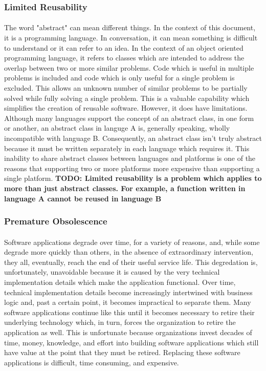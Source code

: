 \documentclass[hidelinks]{article}
\begin{document}
\subsubsection{Limited Reusability}\paragraph{}The word "abstract" can mean different things. In the context of this document, it is a programming language. In conversation, it can mean something is difficult to understand or it can refer to an idea. In the context of an object oriented programming language, it refers to classes which are intended to address the overlap between two or more similar problems. Code which is useful in multiple problems is included and code which is only useful for a single problem is excluded. This allows an unknown number of similar problems to be partially solved while fully solving a single problem. This is a valuable capability which simplifies the creation of reusable software. However, it does have limitations. Although many languages support the concept of an abstract class, in one form or another, an abstract class in languge A is, generally speaking, wholly incompatible with language B. Consequently, an abstract class isn't truly abstract because it must be written separately in each language which requires it. This inability to share abstract classes between languages and platforms is one of the reasons that supporting two or more platforms more expensive than supporting a single platform.
\textbf{TODO: Limited reusability is a problem which applies to more than just abstract classes. For example, a function written in language A cannot be reused in language B}
\subsubsection{Premature Obsolescence}\paragraph{}Software applications degrade over time, for a variety of reasons, and, while some degrade more quickly than others, in the absence of extraordinary intervention, they all, eventually, reach the end of their useful service life. This degredation is, unfortunately, unavoidable because it is caused by the very technical implementation details which make the application functional. Over time, technical implementation details become increasingly intertwined with business logic and, past a certain point, it becomes impractical to separate them. Many software applications continue like this until it becomes necessary to retire their underlying technology which, in turn, forces the organization to retire the application as well. This is unfortunate because organizations invest decades of time, money, knowledge, and effort into building software applications which still have value at the point that they must be retired. Replacing these software applications is difficult, time consuming, and expensive.
\end{document}
